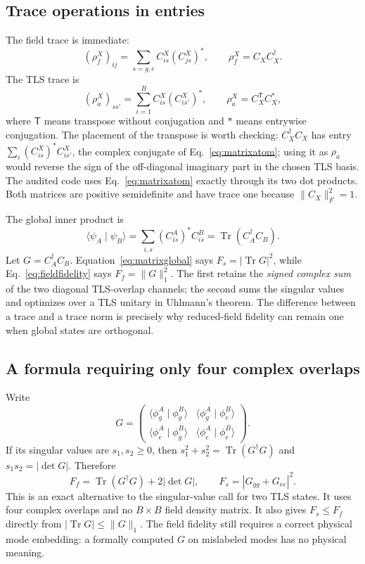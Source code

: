 \documentclass[11pt,a4paper]{article}
\newcommand{\braket}[2]{\langle #1\mid #2\rangle}
\newcommand{\Tr}{\operatorname{Tr}}
\begin{document}
\subsection{Trace operations in entries}
The field trace is immediate:
\begin{equation}
 (\rho_f^X)_{ij}=\sum_{s=g,e} C^X_{is}(C^X_{js})^*,
 \qquad \rho_f^X=C_XC_X^\dagger.
 \label{eq:matrixfield}
\end{equation}
The TLS trace is
\begin{equation}
 (\rho_a^X)_{ss'}=\sum_{i=1}^B C^X_{is}(C^X_{is'})^*,
 \qquad \rho_a^X=C_X^{\mathsf T}C_X^*,
 \label{eq:matrixatom}
\end{equation}
where $\mathsf T$ means transpose without conjugation and $*$ means entrywise conjugation. The placement of the transpose is worth checking: $C_X^\dagger C_X$ has entry $\sum_i(C_{is}^X)^*C_{is'}^X$, the complex conjugate of Eq.~\eqref{eq:matrixatom}; using it as $\rho_a$ would reverse the sign of the off-diagonal imaginary part in the chosen TLS basis. The audited code uses Eq.~\eqref{eq:matrixatom} exactly through its two dot products. Both matrices are positive semidefinite and have trace one because $\|C_X\|_F^2=1$.

The global inner product is
\begin{equation}
 \braket{\psi_A}{\psi_B}
 =\sum_{i,s}(C^A_{is})^*C^B_{is}
 =\Tr(C_A^\dagger C_B).
 \label{eq:matrixglobal}
\end{equation}
Let $G=C_A^\dagger C_B$. Equation~\eqref{eq:matrixglobal} says $F_s=|\Tr G|^2$, while Eq.~\eqref{eq:fieldfidelity} says $F_f=\|G\|_1^2$. The first retains the \emph{signed complex sum} of the two diagonal TLS-overlap channels; the second sums the singular values and optimizes over a TLS unitary in Uhlmann's theorem. The difference between a trace and a trace norm is precisely why reduced-field fidelity can remain one when global states are orthogonal.

\subsection{A formula requiring only four complex overlaps}
Write
\begin{equation}
 G=\begin{pmatrix}
 \braket{\phi_g^A}{\phi_g^B}&\braket{\phi_g^A}{\phi_e^B}\\
 \braket{\phi_e^A}{\phi_g^B}&\braket{\phi_e^A}{\phi_e^B}
 \end{pmatrix}.
 \label{eq:Gentries}
\end{equation}
If its singular values are $s_1,s_2\ge0$, then $s_1^2+s_2^2=\Tr(G^\dagger G)$ and $s_1s_2=|\det G|$. Therefore
\begin{equation}
 \boxed{F_f=\Tr(G^\dagger G)+2|\det G|,
 \qquad F_s=|G_{gg}+G_{ee}|^2.}
 \label{eq:tinyformula}
\end{equation}
This is an exact alternative to the singular-value call for two TLS states. It uses four complex overlaps and no $B\times B$ field density matrix. It also gives $F_s\le F_f$ directly from $|\Tr G|\le\|G\|_1$. The field fidelity still requires a correct physical mode embedding: a formally computed $G$ on mislabeled modes has no physical meaning.
\end{document}
